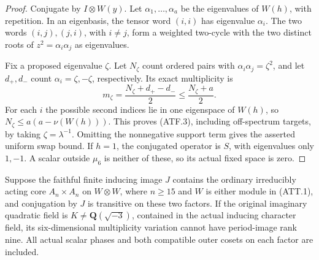 \begin{proof}
Conjugate by $I\otimes W(y)$. Let $\alpha_1,\ldots,\alpha_a$
be the eigenvalues of $W(h)$, with repetition. In an eigenbasis,
the tensor word $(i,i)$ has eigenvalue $\alpha_i$.
The two words $(i,j),(j,i)$, with $i\ne j$, form a weighted
two-cycle with the two distinct roots of
$z^2=\alpha_i\alpha_j$ as eigenvalues.

Fix a proposed eigenvalue $\zeta$. Let $N_\zeta$ count ordered
pairs with $\alpha_i\alpha_j=\zeta^2$, and let $d_+,d_-$
count $\alpha_i=\zeta,-\zeta$, respectively. Its exact
multiplicity is
\[
             m_\zeta=\frac{N_\zeta+d_+-d_-}{2}
                      \le\frac{N_\zeta+a}{2}.              \tag{ATF.4}
\]
For each $i$ the possible second indices lie in one eigenspace
of $W(h)$, so
$N_\zeta\le a(a-\nu(W(h)))$.
This proves (ATF.3), including off-spectrum targets, by taking
$\zeta=\lambda^{-1}$. Omitting the nonnegative support term
gives the asserted uniform swap bound.
If $h=1$, the conjugated operator is $S$, with eigenvalues
only $1,-1$. A scalar outside $\mu_6$ is neither of these,
so its actual fixed space is zero.
\end{proof}

\begin{theorem}
\label{D-ATT-06}
Suppose the faithful finite inducing image $J$ contains the
ordinary irreducibly acting core $A_n\times A_n$ on $W\otimes W$,
where $n\ge15$ and $W$ is either module in (ATT.1), and
conjugation by $J$ is transitive on these two factors.
If the original imaginary quadratic field is
$K\ne\mathbf Q(\sqrt{-3})$, contained in the actual inducing
character field, its six-dimensional multiplicity variation
cannot have period-image rank nine. All actual scalar phases
and both compatible outer cosets on each factor are included.
\end{theorem}

